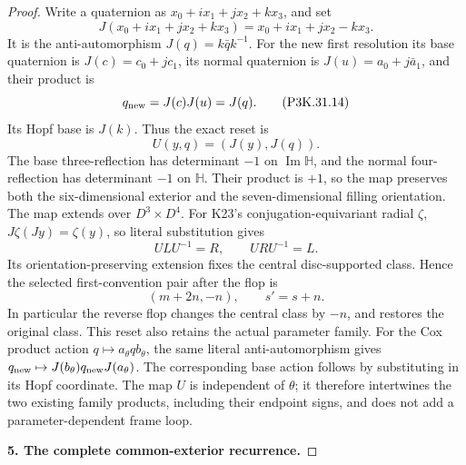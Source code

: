 \begin{proof}
Write a quaternion as \(x_0+ix_1+jx_2+kx_3\), and set
\[
 J(x_0+ix_1+jx_2+kx_3)=x_0+ix_1+jx_2-kx_3.
                                                        \tag{P3K.31.13}
\]
It is the anti-automorphism \(J(q)=k\bar q k^{-1}\).
For the new first resolution its base quaternion is
\(J(c)=c_0+jc_1\), its normal quaternion is
\(J(u)=a_0+j\bar a_1\), and their product is
\[
                      q_{\rm new}=J(c)J(u)=J(q).
                                                        \tag{P3K.31.14}
\]
Its Hopf base is \(J(k)\). Thus the exact reset is
\[
                       U(y,q)=(J(y),J(q)).
                                                        \tag{P3K.31.15}
\]
The base three-reflection has determinant \(-1\) on
\(\operatorname{Im}\mathbb H\), and the normal
four-reflection has determinant \(-1\) on
\(\mathbb H\). Their product is \(+1\), so the map
preserves both the six-dimensional exterior and
the seven-dimensional filling orientation.
The map extends over \(D^3\times D^4\).
For K23's conjugation-equivariant radial \(\zeta\),
\(J\zeta(Jy)=\zeta(y)\), so literal substitution gives
\[
                    ULU^{-1}=R,\qquad URU^{-1}=L.
                                                        \tag{P3K.31.16}
\]
Its orientation-preserving extension fixes the central
disc-supported class. Hence the selected first-convention
pair after the flop is
\[
                        (m+2n,-n),\qquad s'=s+n.
                                                        \tag{P3K.31.17}
\]
In particular the reverse flop changes the central class
by \(-n\), and restores the original class.
This reset also retains the actual parameter family.
For the Cox product action \(q\mapsto a_\theta q b_\theta\),
the same literal anti-automorphism gives
\(q_{\rm new}\mapsto J(b_\theta)q_{\rm new}J(a_\theta)\).
The corresponding base action follows by substituting
in its Hopf coordinate. The map \(U\) is independent of
\(\theta\); it therefore intertwines the two existing
family products, including their endpoint signs, and
does not add a parameter-dependent frame loop.

\par\medskip\noindent\textbf{5. The complete common-exterior recurrence.}\enspace


\end{proof}
